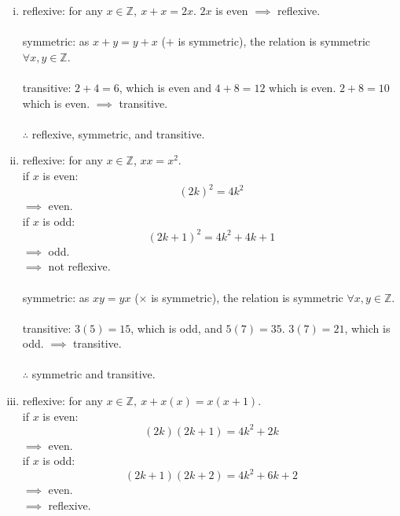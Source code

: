 \documentclass{article}
\begin{document}
\begin{enumerate}
\begin{enumerate}[(i)]
                symmetric: as $x+y=y+x$ ($+$ is symmetric), the relation is symmetric $\forall x,y\in\mathbb{Z}$.\\\\
                transitive: $2+3=5$, which is odd, and $3+4=7$ which is odd. $2+4=6$ which is not odd. $\implies$ not transitive.\\\\
                $\therefore$ symmetric.
          \item
                reflexive: for any $x\in \mathbb{Z},\ x+x=2x$. $2x$ is even $\implies$ reflexive.\\\\
                symmetric: as $x+y=y+x$ ($+$ is symmetric), the relation is symmetric $\forall x,y\in\mathbb{Z}$.\\\\
                transitive: $2+4=6$, which is even and $4+8=12$ which is even. $2+8=10$ which is even. $\implies$ transitive.\\\\
                $\therefore$ reflexive, symmetric, and transitive.
          \item
                reflexive: for any $x\in \mathbb{Z}$, $xx=x^{2}$.\\
                if $x$ is even:\[(2k)^{2}=4k^{2}\]$\implies$ even.\\
                if $x$ is odd:\[(2k+1)^{2}=4k^{2}+4k+1\] $\implies$ odd.\\
                $\implies$ not reflexive.\\\\
                symmetric: as $xy=yx$ ($\times$ is symmetric), the relation is symmetric $\forall x,y\in\mathbb{Z}$.\\\\
                transitive: $3(5)=15$, which is odd, and $5(7)=35$. $3(7)=21$, which is odd. $\implies$ transitive.\\\\
                $\therefore$ symmetric and transitive.
          \item
                reflexive: for any $x\in \mathbb{Z},\ x+x(x)=x(x+1).$\\
                if $x$ is even:\[(2k)(2k+1)=4k^{2}+2k\]$\implies$ even.\\
                if $x$ is odd:\[(2k+1)(2k+2)=4k^{2}+6k+2\]$\implies$ even.\\
                $\implies$ reflexive.\\\\

\end{enumerate}
\end{enumerate}
\end{document}
